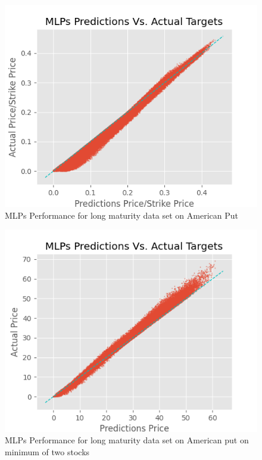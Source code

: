 \begin{figure}[th]
\centering
\includegraphics{Figures/longTAmerP.png}
\decoRule
\caption[MLPs Performance for long maturity data set on American Put]{MLPs Performance for long maturity data set on American Put}
\label{fig:MLPsAmerPLongT}
\end{figure}

\begin{figure}[th]
\centering
\includegraphics{Figures/longTAmerMinP.png}
\decoRule
\caption[MLPs Performance on long maturity data set on American bivariate contingent claim]{MLPs Performance for long maturity data set on American put on minimum of two stocks}
\label{fig:MLPsEuroC}
\end{figure}


